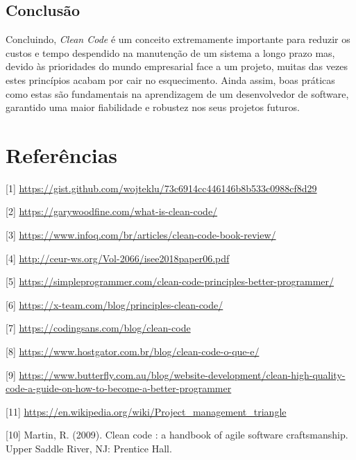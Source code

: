 \documentclass[10pt,portuguese]{article}
\begin{document}
\subsection{Conclusão}

\Par Concluindo, \textit{Clean Code} é um conceito extremamente importante para reduzir os custos e tempo despendido na manutenção de um sistema a longo prazo mas, devido às prioridades do mundo empresarial face a um projeto, muitas das vezes estes princípios acabam por cair no esquecimento. Ainda assim, boas práticas como estas são fundamentais na aprendizagem de um desenvolvedor de software, garantido uma maior fiabilidade e robustez nos seus projetos futuros.
 
\clearpage

\section{Referências}





\vspace{5mm} %

[1] \url{https://gist.github.com/wojteklu/73c6914cc446146b8b533c0988cf8d29}

[2] \url{https://garywoodfine.com/what-is-clean-code/}

[3] \url{https://www.infoq.com/br/articles/clean-code-book-review/}

[4] \url{http://ceur-ws.org/Vol-2066/isee2018paper06.pdf}

[5] \url{https://simpleprogrammer.com/clean-code-principles-better-programmer/}

[6] \url{https://x-team.com/blog/principles-clean-code/}

[7] \url{https://codingsans.com/blog/clean-code}

[8] \url{https://www.hostgator.com.br/blog/clean-code-o-que-e/}

[9] \url{https://www.butterfly.com.au/blog/website-development/clean-high-quality-code-a-guide-on-how-to-become-a-better-programmer}

[11] \url{https://en.wikipedia.org/wiki/Project_management_triangle}

[10] Martin, R. (2009). Clean code : a handbook of agile software craftsmanship. Upper Saddle River, NJ: Prentice Hall.
\end{document}
